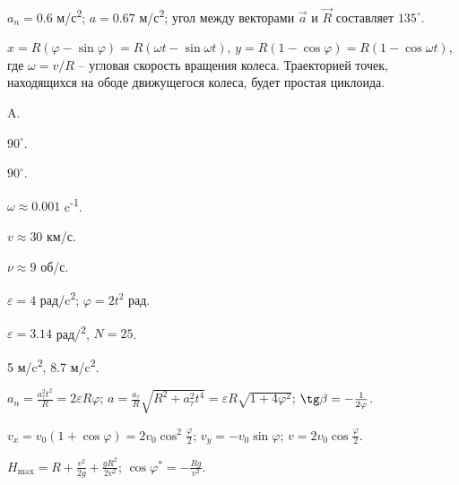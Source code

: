 \begin{Answer}{39}
$a_n = 0.6$ м/с\textsuperscript{2}; $a = 0.67$ м/с\textsuperscript{2}; угол между векторами $\vec{a}$ и $\vec{R}$ составляет $135^{\circ}$.
\end{Answer}
\begin{Answer}{40}
$x= R(\varphi - \sin \varphi) = R(\omega t - \sin \omega t)$, $y=R(1-\cos \varphi) = R(1-\cos \omega t)$, где $\omega = v/R$ -- угловая скорость вращения колеса. Траекторией точек, находящихся на ободе движущегося колеса, будет простая циклоида.
\end{Answer}
\begin{Answer}{41}
\end{Answer}
\begin{Answer}{42}
A.
\end{Answer}
\begin{Answer}{43}
$90^{\circ}$.
\end{Answer}
\begin{Answer}{44}
$90^{\circ}$.
\end{Answer}
\begin{Answer}{45}
$\omega \approx 0.001$ c\textsuperscript{-1}.
\end{Answer}
\begin{Answer}{46}
$v \approx 30$ км/с.
\end{Answer}
\begin{Answer}{47}
$\nu \approx 9$ об/с.
\end{Answer}
\begin{Answer}{48}
$\varepsilon = 4$ рад/c\textsuperscript{2}; $\varphi = 2t^2$ рад.
\end{Answer}
\begin{Answer}{49}
$\varepsilon =  3.14$ рад/\textsuperscript{2}, $N = 25$.
\end{Answer}
\begin{Answer}{50}
5 м/c\textsuperscript{2}, 8.7 м/c\textsuperscript{2}.
\end{Answer}
\begin{Answer}{51}
$a_n = \frac{a_{\tau}^2 t^2}{R} = 2 \varepsilon R \varphi$; $a = \frac{a_{\tau}}{R} \sqrt{R^2 + a_{\tau}^2 t^4} = \varepsilon R \sqrt{1 + 4 \varphi^2}$; $\tg \beta = -\frac{1}{2\varphi}$.
\end{Answer}
\begin{Answer}{52}
$v_x = v_0 (1 + \cos \varphi) = 2v_0 \cos^2 \frac{\varphi}{2}$; $v_y = -v_0 \sin \varphi$; $v = 2v_0 \cos \frac{\varphi}{2}$.
\end{Answer}
\begin{Answer}{53}
$H_{\max} = R + \frac{v^2}{2g} + \frac{gR^2}{2v^2}$; $\cos \varphi^{*} = - \frac{Rg}{v^2}$.
\end{Answer}
